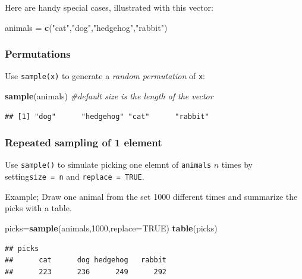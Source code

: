 \documentclass[
]{book}
\newenvironment{Shaded}{\begin{snugshade}}{\end{snugshade}}
\newcommand{\AttributeTok}[1]{\textcolor[rgb]{0.13,0.29,0.53}{#1}}
\newcommand{\CommentTok}[1]{\textcolor[rgb]{0.56,0.35,0.01}{\textit{#1}}}
\newcommand{\ConstantTok}[1]{\textcolor[rgb]{0.56,0.35,0.01}{#1}}
\newcommand{\DecValTok}[1]{\textcolor[rgb]{0.00,0.00,0.81}{#1}}
\newcommand{\FunctionTok}[1]{\textcolor[rgb]{0.13,0.29,0.53}{\textbf{#1}}}
\newcommand{\NormalTok}[1]{#1}
\newcommand{\OtherTok}[1]{\textcolor[rgb]{0.56,0.35,0.01}{#1}}
\newcommand{\StringTok}[1]{\textcolor[rgb]{0.31,0.60,0.02}{#1}}
\theoremstyle{definition}
\theoremstyle{definition}
\theoremstyle{definition}
\theoremstyle{definition}
\theoremstyle{remark}
\begin{document}
Here are handy special cases, illustrated with this vector:

\begin{Shaded}
\begin{Highlighting}[]
\NormalTok{animals }\OtherTok{=} \FunctionTok{c}\NormalTok{(}\StringTok{"cat"}\NormalTok{,}\StringTok{"dog"}\NormalTok{,}\StringTok{"hedgehog"}\NormalTok{,}\StringTok{"rabbit"}\NormalTok{)}
\end{Highlighting}
\end{Shaded}

\subsubsection{Permutations}\label{permutations-1}

Use \texttt{sample(x)} to generate a \emph{random permutation} of \texttt{x}:

\begin{Shaded}
\begin{Highlighting}[]
\FunctionTok{sample}\NormalTok{(animals) }\CommentTok{\#default size is the length of the vector}
\end{Highlighting}
\end{Shaded}

\begin{verbatim}
## [1] "dog"      "hedgehog" "cat"      "rabbit"
\end{verbatim}

\subsubsection{Repeated sampling of 1 element}\label{repeated-sampling-of-1-element}

Use \texttt{sample()} to simulate picking one elemnt of \texttt{animals} \(n\) times by setting\texttt{size\ =\ n} and \texttt{replace\ =\ TRUE}.

Example; Draw one animal from the set 1000 different times and summarize the picks with a table.

\begin{Shaded}
\begin{Highlighting}[]
\NormalTok{picks}\OtherTok{=}\FunctionTok{sample}\NormalTok{(animals,}\DecValTok{1000}\NormalTok{,}\AttributeTok{replace=}\ConstantTok{TRUE}\NormalTok{) }
\FunctionTok{table}\NormalTok{(picks) }
\end{Highlighting}
\end{Shaded}

\begin{verbatim}
## picks
##      cat      dog hedgehog   rabbit 
##      223      236      249      292
\end{verbatim}
\end{document}
